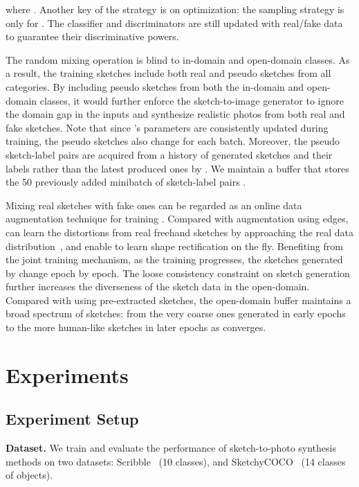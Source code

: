 \documentclass[10pt,twocolumn,letterpaper]{article}
\begin{document}
where . Another key of the strategy is on optimization: the sampling strategy is only for . The classifier and discriminators are still updated with real/fake data to guarantee their discriminative powers. 

The random mixing operation is blind to in-domain and open-domain classes. As a result, the training sketches include both real and pseudo sketches from all categories. By including pseudo sketches from both the in-domain and open-domain classes, it would further enforce the sketch-to-image generator to ignore the domain gap in the inputs and synthesize realistic photos from both real and fake sketches. Note that since 's parameters are consistently updated during training, the pseudo sketches also change for each batch. Moreover, the pseudo sketch-label pairs are acquired from a history of generated sketches and their labels rather than the latest produced ones by . We maintain a buffer that stores the 50 previously added minibatch of sketch-label pairs \cite{shrivastava2017learning,zhu2017unpaired}. 

Mixing real sketches with fake ones can be regarded as an online data augmentation technique for training . Compared with augmentation using edges,  can learn the distortions from real freehand sketches by approaching the real data distribution~\cite{goodfellow2014generative,ledig2017photo,zhou2019kernel}, and enable  to learn shape rectification on the fly. Benefiting from the joint training mechanism, as the training progresses, the sketches generated by  change epoch by epoch. The loose consistency constraint on sketch generation further increases the diverseness of the sketch data in the open-domain. Compared with using pre-extracted sketches, the open-domain buffer maintains a broad spectrum of sketches: from the very coarse ones generated in early epochs to the more human-like sketches in later epochs as  converges. 







\section{Experiments}


\subsection{Experiment Setup}
\label{sec:exp_setup}
\noindent \textbf{Dataset.} We train and evaluate the performance of sketch-to-photo synthesis methods on two datasets: Scribble~\cite{ghosh2019interactive} (10 classes), and SketchyCOCO~\cite{gao2020sketchycoco} (14 classes of objects). 
\end{document}
